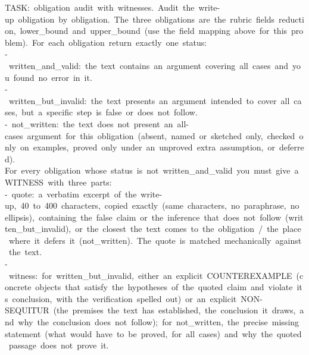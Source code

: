 \begin{flushleft}\ttfamily\scriptsize{}
{}TASK:\ obligation\ audit\ with\ witnesses.\ Audit\ the\ write-{}up\ obligation\ by\ obligation.\ The\ three\ obligations\ are\ the\ rubric\ fields\ \textquotedbl{}reduction\textquotedbl{},\ \textquotedbl{}lower\_bound\textquotedbl{}\ and\ \textquotedbl{}upper\_bound\textquotedbl{}\ (use\ the\ field\ mapping\ above\ for\ this\ problem).\ For\ each\ obligation\ return\ exactly\ one\ status:\\
{}-{}\ \textquotedbl{}written\_and\_valid\textquotedbl{}:\ the\ text\ contains\ an\ argument\ covering\ all\ cases\ and\ you\ found\ no\ error\ in\ it.\\
{}-{}\ \textquotedbl{}written\_but\_invalid\textquotedbl{}:\ the\ text\ presents\ an\ argument\ intended\ to\ cover\ all\ cases,\ but\ a\ specific\ step\ is\ false\ or\ does\ not\ follow.\\
{}-{}\ \textquotedbl{}not\_written\textquotedbl{}:\ the\ text\ does\ not\ present\ an\ all-{}cases\ argument\ for\ this\ obligation\ (absent,\ named\ or\ sketched\ only,\ checked\ only\ on\ examples,\ proved\ only\ under\ an\ unproved\ extra\ assumption,\ or\ deferred).\\
{}For\ every\ obligation\ whose\ status\ is\ not\ \textquotedbl{}written\_and\_valid\textquotedbl{}\ you\ must\ give\ a\ WITNESS\ with\ three\ parts:\\
{}-{}\ \textquotedbl{}quote\textquotedbl{}:\ a\ verbatim\ excerpt\ of\ the\ write-{}up,\ 40\ to\ 400\ characters,\ copied\ exactly\ (same\ characters,\ no\ paraphrase,\ no\ ellipsis),\ containing\ the\ false\ claim\ or\ the\ inference\ that\ does\ not\ follow\ (written\_but\_invalid),\ or\ the\ closest\ the\ text\ comes\ to\ the\ obligation\ /\ the\ place\ where\ it\ defers\ it\ (not\_written).\ The\ quote\ is\ matched\ mechanically\ against\ the\ text.\\
{}-{}\ \textquotedbl{}witness\textquotedbl{}:\ for\ written\_but\_invalid,\ either\ an\ explicit\ COUNTEREXAMPLE\ (concrete\ objects\ that\ satisfy\ the\ hypotheses\ of\ the\ quoted\ claim\ and\ violate\ its\ conclusion,\ with\ the\ verification\ spelled\ out)\ or\ an\ explicit\ NON-{}SEQUITUR\ (the\ premises\ the\ text\ has\ established,\ the\ conclusion\ it\ draws,\ and\ why\ the\ conclusion\ does\ not\ follow);\ for\ not\_written,\ the\ precise\ missing\ statement\ (what\ would\ have\ to\ be\ proved,\ for\ all\ cases)\ and\ why\ the\ quoted\ passage\ does\ not\ prove\ it.\\

\end{flushleft}
